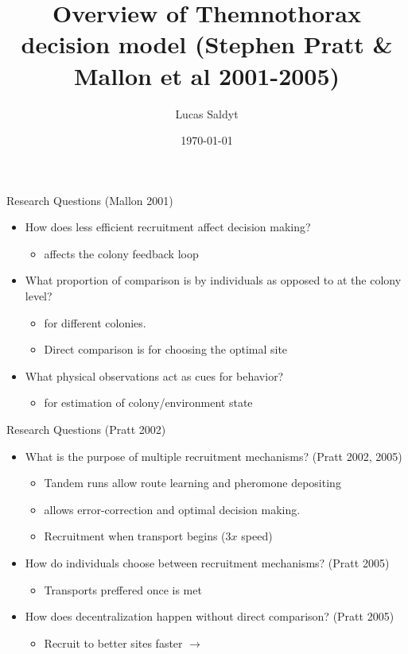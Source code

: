\documentclass{beamer}
\title{Overview of Themnothorax decision model (Stephen Pratt \& Mallon et al 2001-2005)}
\date{\today}
\author{Lucas Saldyt}
\institute{Arizona State University}
\makeatletter
\def\mcolor#1#{\@mcolor{#1}}
\def\@mcolor#1#2#3{%
  \protect\leavevmode
  \begingroup
    \color#1{#2}#3%
  \endgroup
}
\newcommand{\sitem}[1]
{
    \begin{itemize}
        \item #1
    \end{itemize}
}
\makeatother
\begin{document}
  \maketitle

  \begin{frame}{Research Questions (Mallon 2001)}
      \begin{itemize}
          \item How does less efficient recruitment affect decision making?
              \sitem{ affects the colony feedback loop}
          \item What proportion of comparison is by individuals as opposed to at the colony level? 
          \sitem{ for different colonies.}
          \sitem{Direct comparison is  for choosing the optimal site}
          \item What physical observations act as cues for behavior? 
              \sitem{ for estimation of colony/environment state}
      \end{itemize}
  \end{frame}

  \begin{frame}{Research Questions (Pratt 2002)}
      \begin{itemize}
          \item What is the purpose of multiple recruitment mechanisms? (Pratt 2002, 2005)
              \sitem{Tandem runs allow route learning and pheromone depositing}
              \sitem{ allows error-correction and optimal decision making.}
              \sitem{Recruitment  when transport begins ($3x$ speed)}
          \item How do individuals choose between recruitment mechanisms? (Pratt 2005)
              \sitem{Transports preffered once  is met}
          \item How does decentralization happen without direct comparison? (Pratt 2005)
              \sitem{Recruit to better sites faster $\rightarrow$ \mcolor{red}{positive feedback}}
      \end{itemize}
  \end{frame}
\end{document}

